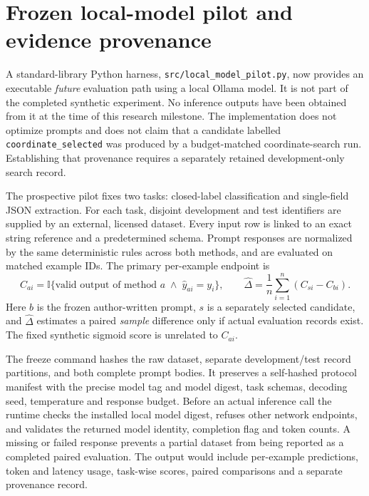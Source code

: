 \section{Frozen local-model pilot and evidence provenance}
\label{sec:local-model-pilot}
A standard-library Python harness, \texttt{src/local\_model\_pilot.py},
now provides an executable \emph{future} evaluation path using a local
Ollama model. It is not part of the completed synthetic experiment.
No inference outputs have been obtained from it at the time of this
research milestone. The implementation does not optimize prompts and
does not claim that a candidate labelled \texttt{coordinate\_selected}
was produced by a budget-matched coordinate-search run. Establishing
that provenance requires a separately retained development-only search
record.

The prospective pilot fixes two tasks: closed-label classification and
single-field JSON extraction. For each task, disjoint development and
test identifiers are supplied by an external, licensed dataset. Every
input row is linked to an exact string reference and a predetermined
schema. Prompt responses are normalized by the same deterministic
rules across both methods, and are evaluated on matched example IDs.
The primary per-example endpoint is
\begin{equation}
C_{ai}=
\mathbb{I}\{\text{valid output of method }a
\;\land\;\hat y_{ai}=y_i\},\qquad
\widehat\Delta=\frac{1}{n}\sum_{i=1}^{n}(C_{si}-C_{bi}).
\label{eq:local-pilot-paired}
\end{equation}
Here $b$ is the frozen author-written prompt, $s$ is a separately
selected candidate, and $\widehat\Delta$ estimates a paired
\emph{sample} difference only if actual evaluation records exist.
The fixed synthetic sigmoid score is unrelated to $C_{ai}$.

The freeze command hashes the raw dataset, separate development/test
record partitions, and both complete prompt bodies. It preserves a
self-hashed protocol manifest with the precise model tag and model
digest, task schemas, decoding seed, temperature and response budget.
Before an actual inference call the runtime checks the installed
local model digest, refuses other network endpoints, and validates
the returned model identity, completion flag and token counts. A
missing or failed response prevents a partial dataset from being
reported as a completed paired evaluation. The output would include
per-example predictions, token and latency usage, task-wise scores,
paired comparisons and a separate provenance record.

